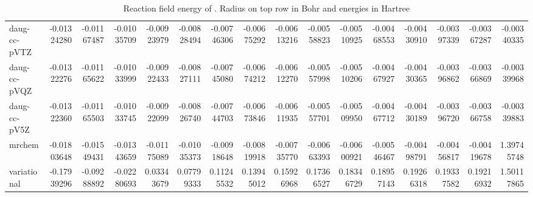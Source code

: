 \documentclass[../master_thesis.tex]{subfiles}
\begin{document}
\begin{sidewaystable}
{{\begin{tabular}{l|r|r|r|r|r|r|r|r|r|r|r|r|r|r|r}
  daug-cc-pVTZ & -0.01324280 & -0.01167487 & -0.01035709 & -0.00923979 & -0.00828494 & -0.00746306 & -0.00675292 & -0.00613216 & -0.00558823 & -0.00510925 & -0.00468553 & -0.00430910 & -0.00397339 & -0.00367287 & -0.00340335 \\
  daug-cc-pVQZ & -0.01322276 & -0.01165622 & -0.01033999 & -0.00922433 & -0.00827111 & -0.00745080 & -0.00674212 & -0.00612270 & -0.00557998 & -0.00510206 & -0.00467927 & -0.00430365 & -0.00396862 & -0.00366869 & -0.00339968 \\
  daug-cc-pV5Z & -0.01322360 & -0.01165503 & -0.01033745 & -0.00922099 & -0.00826740 & -0.00744703 & -0.00673846 & -0.00611935 & -0.00557701 & -0.00509950 & -0.00467712 & -0.00430189 & -0.00396720 & -0.00366758 & -0.00339883 \\ \hline
  mrchem & -0.01803648 & -0.01549431 & -0.01343659 & -0.01175089 & -0.01035373 & -0.00918648 & -0.00819918 & -0.00735770 & -0.00663393 & -0.00600921 & -0.00546467 & -0.00498791 & -0.00456817 & -0.00419678 & 1.39745748 \\
  variational & -0.17939296 & -0.09288892 & -0.02280693 & 0.03343679 & 0.07799333 & 0.11245532 & 0.13945012 & 0.15926968 & 0.17366527 & 0.18346729 & 0.18957143 & 0.19266318 & 0.19337582 & 0.19216932 & 1.50117865 \\
  \end{tabular}}}{  \caption{Reaction field energy of . Radius on top row in Bohr and energies in Hartree}\label{tab:Erdatawat}}


\end{sidewaystable}
\end{document}
